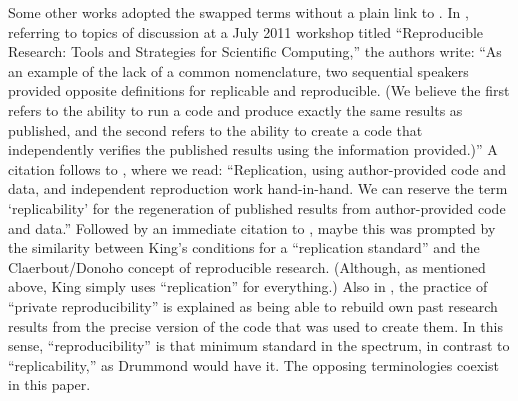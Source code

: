 \documentclass{statement}
\begin{document}
Some other works adopted the swapped terms without a plain link to \cite{drummond2009}. 
In \cite{levequeETal2012}, referring to topics of discussion at a July 2011 workshop titled ``Reproducible Research: Tools and Strategies for Scientific Computing,'' the authors write: ``As an example of the lack of a common nomenclature, two sequential speakers provided opposite definitions for replicable and reproducible. (We believe the  first refers to the ability to run a code and produce exactly the same results as published, and the second refers to the ability to create a code that independently verifies the published results using the information provided.)'' 
A citation follows to \cite{stodden2011}, where we read: ``Replication, using author-provided code and data, and independent reproduction work hand-in-hand. We can reserve the term `replicability' for the regeneration of published results from author-provided code and data.'' Followed by an immediate citation to \cite{king1995}, maybe this was prompted by the similarity between King's conditions for a ``replication standard'' and the Claerbout/Donoho concept of reproducible research. 
(Although, as mentioned above, King simply uses ``replication'' for everything.) 
Also in \cite{levequeETal2012}, the practice of ``private reproducibility'' is explained as being able to rebuild own past research results from the precise version of the code that was used to create them. 
In this sense, ``reproducibility'' is that minimum standard in the spectrum, in contrast to ``replicability,'' as Drummond would have it. 
The opposing terminologies coexist in this paper.
\end{document}
